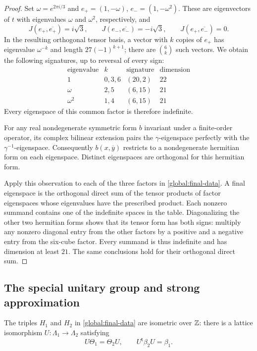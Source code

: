 \begin{proof}
Set $\omega=e^{2\pi i/3}$ and $e_+=(1,-\omega)$,
$e_-=(1,-\omega^2)$.  These are eigenvectors of $t$ with
eigenvalues $\omega$ and $\omega^2$, respectively, and
\[
 J(e_+,\overline{e_+})=i\sqrt3,
 \qquad J(e_-,\overline{e_-})=-i\sqrt3,
 \qquad J(e_+,\overline{e_-})=0.
\]
In the resulting orthogonal tensor basis, a vector with $k$ copies
of $e_+$ has eigenvalue $\omega^{-k}$ and length
$27(-1)^{k+1}$; there are $\binom6k$ such vectors.  We obtain the
following signatures, up to reversal of every sign:
\[
\begin{array}{c|c|c|c}
 \text{eigenvalue}&k&\text{signature}&\text{dimension}\\\hline
 1&0,3,6&(20,2)&22\\
 \omega&2,5&(6,15)&21\\
 \omega^2&1,4&(6,15)&21
\end{array}
\]
Every eigenspace of this common factor is therefore indefinite.

For any real nondegenerate symmetric form $b$ invariant under a
finite-order operator, its complex bilinear extension pairs the
$\gamma$-eigenspace perfectly with the $\gamma^{-1}$-eigenspace.
Consequently $b(x,\overline y)$ restricts to a nondegenerate
hermitian form on each eigenspace.  Distinct eigenspaces are
orthogonal for this hermitian form.

Apply this observation to each of the three factors in
\eqref{global:final-data}.  A final eigenspace is the orthogonal
direct sum of the tensor products of factor eigenspaces whose
eigenvalues have the prescribed product.  Each nonzero summand
contains one of the indefinite spaces in the table.  Diagonalizing
the other two hermitian forms shows that its tensor form has both
signs: multiply any nonzero diagonal entry from the other factors
by a positive and a negative entry from the six-cube factor.
Every summand is thus indefinite and has dimension at least $21$.
The same conclusions hold for their orthogonal direct sum.
\end{proof}

\subsection{The special unitary group and strong approximation}

\begin{proposition}
\label{global:integral}
The triples $H_1$ and $H_2$ in \eqref{global:final-data} are
isometric over $\mathbb Z$: there is a lattice isomorphism
$U:\Lambda_1\longrightarrow\Lambda_2$ satisfying
\[
 U\Theta_1=\Theta_2U,
 \qquad U^{\mathsf t}\beta_2U=\beta_1.
\]
\end{proposition}

